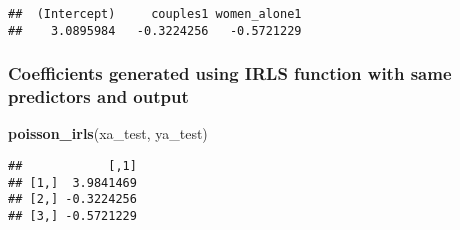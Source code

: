 \documentclass[]{article}
\newenvironment{Shaded}{\begin{snugshade}}{\end{snugshade}}
\newcommand{\KeywordTok}[1]{\textcolor[rgb]{0.13,0.29,0.53}{\textbf{{#1}}}}
\newcommand{\NormalTok}[1]{{#1}}
\begin{document}
\begin{Shaded}
\end{Shaded}

\begin{verbatim}
##  (Intercept)     couples1 women_alone1 
##    3.0895984   -0.3224256   -0.5721229
\end{verbatim}

\subsubsection{Coefficients generated using IRLS function with same
predictors and
output}\label{coefficients-generated-using-irls-function-with-same-predictors-and-output}

\begin{Shaded}
\begin{Highlighting}[]
\KeywordTok{poisson_irls}\NormalTok{(xa_test, ya_test)}
\end{Highlighting}
\end{Shaded}

\begin{verbatim}
##            [,1]
## [1,]  3.9841469
## [2,] -0.3224256
## [3,] -0.5721229
\end{verbatim}
\end{document}
